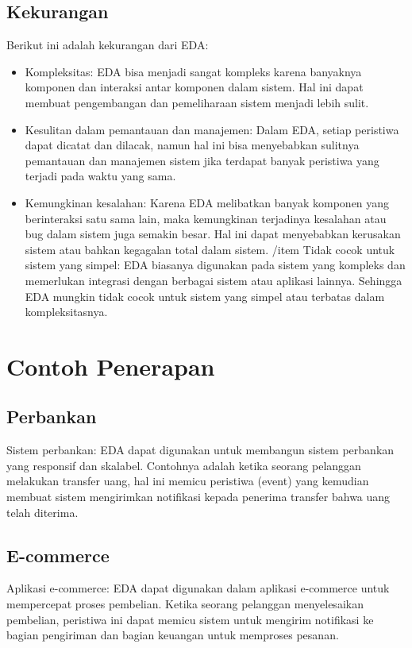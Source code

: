 \subsection{Kekurangan}
Berikut ini adalah kekurangan dari EDA:
\begin{itemize}
\item Kompleksitas: EDA bisa menjadi sangat kompleks karena banyaknya komponen dan interaksi antar komponen dalam sistem. Hal ini dapat membuat pengembangan dan pemeliharaan sistem menjadi lebih sulit.	
\item Kesulitan dalam pemantauan dan manajemen: Dalam EDA, setiap peristiwa dapat dicatat dan dilacak, namun hal ini bisa menyebabkan sulitnya pemantauan dan manajemen sistem jika terdapat banyak peristiwa yang terjadi pada waktu yang sama.	
\item Kemungkinan kesalahan: Karena EDA melibatkan banyak komponen yang berinteraksi satu sama lain, maka kemungkinan terjadinya kesalahan atau bug dalam sistem juga semakin besar. Hal ini dapat menyebabkan kerusakan sistem atau bahkan kegagalan total dalam sistem.
/item Tidak cocok untuk sistem yang simpel: EDA biasanya digunakan pada sistem yang kompleks dan memerlukan integrasi dengan berbagai sistem atau aplikasi lainnya. Sehingga EDA mungkin tidak cocok untuk sistem yang simpel atau terbatas dalam kompleksitasnya.
\end{itemize}

\section{Contoh Penerapan}
	\subsection{Perbankan}
 Sistem perbankan: EDA dapat digunakan untuk membangun sistem perbankan yang responsif dan skalabel. Contohnya adalah ketika seorang pelanggan melakukan transfer uang, hal ini memicu peristiwa (event) yang kemudian membuat sistem mengirimkan notifikasi kepada penerima transfer bahwa uang telah diterima.
\subsection{E-commerce}
 Aplikasi e-commerce: EDA dapat digunakan dalam aplikasi e-commerce untuk mempercepat proses pembelian. Ketika seorang pelanggan menyelesaikan pembelian, peristiwa ini dapat memicu sistem untuk mengirim notifikasi ke bagian pengiriman dan bagian keuangan untuk memproses pesanan.
